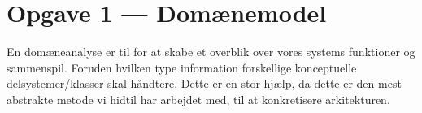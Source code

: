 \section{Opgave 1 --- Domænemodel}
En domæneanalyse er til for at skabe et overblik over vores systems funktioner og sammenspil. Foruden hvilken type information forskellige konceptuelle delsystemer/klasser skal håndtere.
Dette er en stor hjælp, da dette er den mest abstrakte metode vi hidtil har arbejdet med, til at konkretisere arkitekturen.
